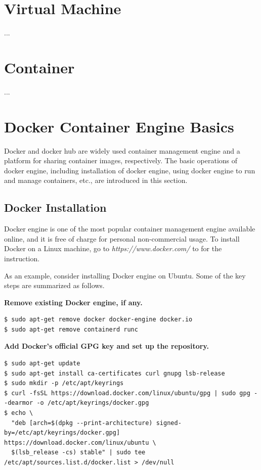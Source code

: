 \section{Virtual Machine}
...
\section{Container}
...
\section{Docker Container Engine Basics} \label{ch:vac:sec:dceb}

Docker and docker hub are widely used container management engine and a platform for sharing container images, respectively. The basic operations of docker engine, including installation of docker engine, using docker engine to run and manage containers, etc., are introduced in this section.

\subsection{Docker Installation}

Docker engine is one of the most popular container management engine available online, and it is free of charge for personal non-commercial usage. To install Docker on a Linux machine, go to \textit{https://www.docker.com/} to for the instruction.

As an example, consider installing Docker engine on Ubuntu. Some of the key steps are summarized as follows.

\vspace{0.1in}
\noindent \textbf{Remove existing Docker engine, if any.}
\begin{lstlisting}
$ sudo apt-get remove docker docker-engine docker.io
$ sudo apt-get remove containerd runc
\end{lstlisting}

\vspace{0.1in}
\noindent \textbf{Add Docker's official GPG key and set up the repository.}
\begin{lstlisting}
$ sudo apt-get update
$ sudo apt-get install ca-certificates curl gnupg lsb-release
$ sudo mkdir -p /etc/apt/keyrings
$ curl -fsSL https://download.docker.com/linux/ubuntu/gpg | sudo gpg --dearmor -o /etc/apt/keyrings/docker.gpg
$ echo \
  "deb [arch=$(dpkg --print-architecture) signed-by=/etc/apt/keyrings/docker.gpg] https://download.docker.com/linux/ubuntu \
  $(lsb_release -cs) stable" | sudo tee /etc/apt/sources.list.d/docker.list > /dev/null
\end{lstlisting}

